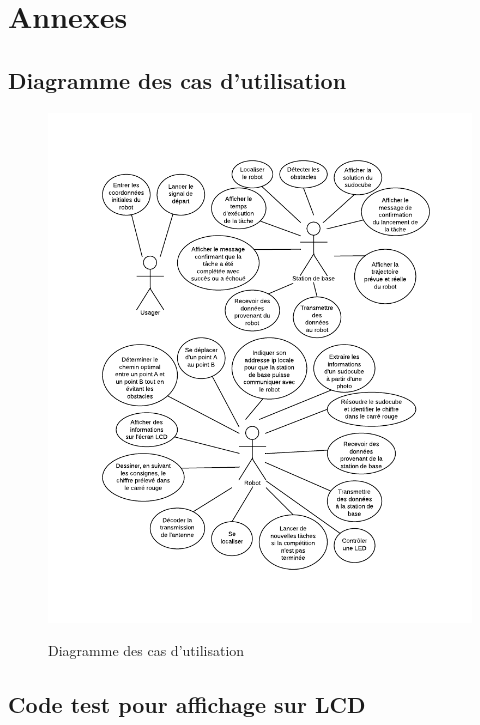 
\chapter{Annexes}
\label{s:annexes}

\section{Diagramme des cas d'utilisation}

\begin{figure}[htp]
  \caption{Diagramme des cas d'utilisation}
  \centering
  \includegraphics[scale=1, trim = 50 50 50 0]{fig/use_cases_diagram.pdf}
  \label{use_cases_diagram}
\end{figure}

\section{Code test pour affichage sur LCD} \label{s:code_LCD}
